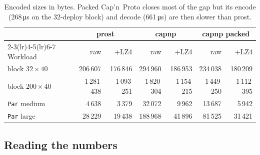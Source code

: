 \documentclass[10pt,a4paper]{article}
\newcommand{\f}[1]{\nolinkurl{#1}}
\newcommand{\capnp}{Cap'n~Proto}
\begin{document}
\begin{table}[h]
\centering\small
\begin{tabular}{@{}lrrrrrr@{}}
\toprule
& \multicolumn{2}{c}{prost} & \multicolumn{2}{c}{capnp} & \multicolumn{2}{c}{capnp packed} \\
\cmidrule(lr){2-3}\cmidrule(lr){4-5}\cmidrule(lr){6-7}
Workload & raw & +LZ4 & raw & +LZ4 & raw & +LZ4 \\
\midrule
block $32{\times}40$  & 206\,607 & 176\,846 & 294\,960 & 186\,953 & 234\,038 & 180\,209 \\
block $200{\times}40$ & 1\,281\,438 & 1\,093\,251 & 1\,820\,304 & 1\,154\,215 & 1\,449\,250 & 1\,112\,395 \\
\f{Par} medium & 4\,638 & 3\,379 & 32\,072 & 9\,962 & 13\,687 & 5\,942 \\
\f{Par} large & 28\,229 & 19\,438 & 188\,968 & 41\,896 & 81\,525 & 31\,421 \\
\bottomrule
\end{tabular}
\caption{Encoded sizes in bytes. Packed \capnp{} closes most of the gap but its encode
(268\,\si{\micro\second} on the 32-deploy block) and decode (661\,\si{\micro\second}) are then
slower than prost.}
\label{tab:sizes}
\end{table}

\subsection{Reading the numbers}
\end{document}
